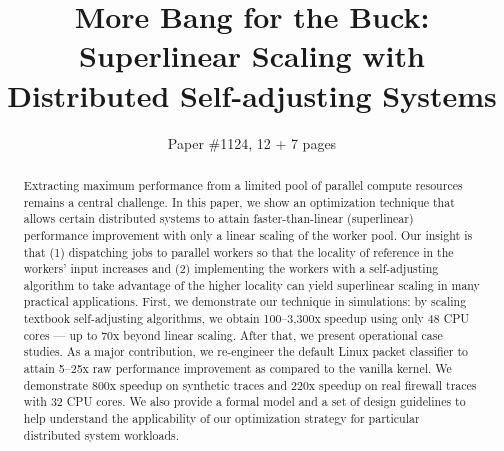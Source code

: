 \documentclass[letterpaper,twocolumn,10pt]{article}
\begin{document}


\title{More Bang for the Buck:
Superlinear Scaling with Distributed Self-adjusting Systems}

\author{Paper \#1124, 12 + 7 pages}

\maketitle

\begin{abstract}
  Extracting maximum performance from a limited pool of parallel compute resources remains a central challenge.  In this paper, we show an optimization technique that allows certain distributed systems to attain faster-than-linear (superlinear) performance improvement with only a linear scaling of the worker pool. Our insight is that (1) dispatching jobs to parallel workers so that the locality of reference in the workers' input increases and (2) implementing the workers with a self-adjusting algorithm to take advantage of the higher locality can yield superlinear scaling in many practical applications. First, we demonstrate our technique in simulations: by scaling textbook self-adjusting algorithms, we obtain 100--3,300x speedup using only 48 CPU cores --- up to 70x beyond linear scaling. After that, we present operational case studies. As a major contribution, we re-engineer the default Linux packet classifier to attain 5--25x raw performance improvement as compared to the vanilla kernel. We demonstrate 800x speedup on synthetic traces and 220x speedup on real firewall traces with 32 CPU cores. We also provide a formal model and a set of design guidelines to help understand the applicability of our optimization strategy for particular distributed system workloads.
\end{abstract}




  
\end{document}

